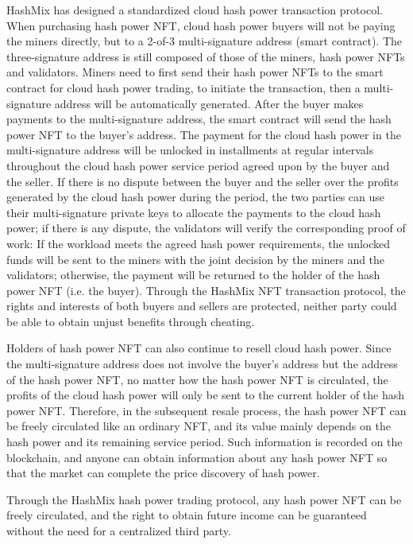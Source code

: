 \documentclass[]{template/llncs}
\begin{document}
HashMix has designed a standardized cloud hash power transaction protocol. When purchasing hash power NFT, cloud hash power buyers will not be paying the miners directly, but to a 2-of-3 multi-signature address (smart contract). The three-signature address is still composed of those of the miners, hash power NFTs and validators. Miners need to first send their hash power NFTs to the smart contract for cloud hash power trading, to initiate the transaction, then a multi-signature address will be automatically generated. After the buyer makes payments to the multi-signature address, the smart contract will send the hash power NFT to the buyer's address. The payment for the cloud hash power in the multi-signature address will be unlocked in installments at regular intervals throughout the cloud hash power service period agreed upon by the buyer and the seller. If there is no dispute between the buyer and the seller over the profits generated by the cloud hash power during the period, the two parties can use their multi-signature private keys to allocate the payments to the cloud hash power; if there is any dispute, the validators will verify the corresponding proof of work: If the workload meets the agreed hash power requirements, the unlocked funds will be sent to the miners with the joint decision by the miners and the validators; otherwise, the payment will be returned to the holder of the hash power NFT (i.e. the buyer). Through the HashMix NFT transaction protocol, the rights and interests of both buyers and sellers are protected, neither party could be able to obtain unjust benefits through cheating.

Holders of hash power NFT can also continue to resell cloud hash power. Since the multi-signature address does not involve the buyer's address but the address of the hash power NFT, no matter how the hash power NFT is circulated, the profits of the cloud hash power will only be sent to the current holder of the hash power NFT. Therefore, in the subsequent resale process, the hash power NFT can be freely circulated like an ordinary NFT, and its value mainly depends on the hash power and its remaining service period. Such information is recorded on the blockchain, and anyone can obtain information about any hash power NFT so that the market can complete the price discovery of hash power.

Through the HashMix hash power trading protocol, any hash power NFT can be freely circulated, and the right to obtain future income can be guaranteed without the need for a centralized third party.
\end{document}
